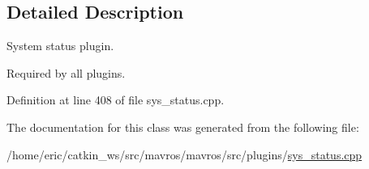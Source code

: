 \subsection{Detailed Description}
System status plugin. 

Required by all plugins. 

Definition at line 408 of file sys\+\_\+status.\+cpp.



The documentation for this class was generated from the following file\+:\begin{DoxyCompactItemize}
\item 
/home/eric/catkin\+\_\+ws/src/mavros/mavros/src/plugins/\mbox{\hyperlink{sys__status_8cpp}{sys\+\_\+status.\+cpp}}\end{DoxyCompactItemize}
